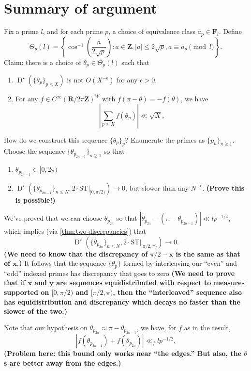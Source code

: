 \documentclass{article}
\DeclareMathOperator{\disc}{D}
\newcommand{\bF}{\mathbf{F}}
\newcommand{\bR}{\mathbf{R}}
\newcommand{\bx}{{\boldsymbol x}}
\newcommand{\by}{{\boldsymbol y}}
\newcommand{\bZ}{\mathbf{Z}}
\newcommand{\ST}{\mathrm{ST}}
\begin{document}
\section{Summary of argument}

Fix a prime $l$, and for each prime $p$, a choice of equivalence class 
$\bar a_p \in \bF_l$. Define 
\[
	\Theta_p(l) = \left\{ \cos^{-1}\left( \frac{a}{2\sqrt p}\right) : a\in \bZ, |a|\leqslant 2\sqrt p, a\equiv \bar a_p \pmod l\right\} .
\]
Claim: there is a choice of $\theta_p\in \Theta_p(l)$ such that 
\begin{enumerate}
\item
$\disc^\star(\{\theta_p\}_{p\leqslant X})$ is not $O(X^{-\epsilon})$ for any 
$\epsilon>0$. 

\item
For any $f\in C^\infty(\bR/2\pi \bZ)^W$ with $f(\pi-\theta) = -f(\theta)$, we 
have 
\[
	\left| \sum_{p\leqslant X} f(\theta_p)\right| \ll \sqrt X .
\]
\end{enumerate}

How do we construct this sequence $\{\theta_p\}_p$? Enumerate the primes as 
$\{p_n\}_{n\geqslant 1}$. Choose the sequence 
$\{\theta_{p_{2 n-1}}\}_{n\geqslant 1}$ so that 
\begin{enumerate}
\item
$\theta_{p_{2n-1}}\in [0,2\pi)$
\item
$\disc^\star\left(\{\theta_{p_{2n-1}}\}_{n\leqslant N}, 2\cdot \ST|_{[0,\pi/2)}\right) \to 0$, but slower 
than any $N^{-\epsilon}$. \textbf{(Prove this is possible!)} 
\end{enumerate}
We've proved that we can choose $\theta_{p_{2n}}$ so that 
$|\theta_{p_{2n}} - (\pi - \theta_{p_{2n-1}})| \ll l p^{-1/4}$, which 
implies (via \autoref{thm:two-discrepancies}) that 
\[
	\disc^\star\left(\{\theta_{p_{2n}}\}_{n\leqslant N}, 2\cdot \ST|_{[\pi/2,\pi)}\right) \to 0 .
\]
\textbf{(We need to know that the discrepancy of $\pi/2-\bx$ is the same as 
that of $\bx$.)} It follows that the sequence $\{\theta_p\}$ formed by 
interleaving our ``even'' and ``odd'' indexed primes has discrepancy that 
goes to zero \textbf{(We need to prove that if $\bx$ and $\by$ are sequences 
equidistributed with respect to measures supported on $[0,\pi/2)$ and 
$[\pi/2,\pi)$, then the ``interleaved'' sequence also has equidistribution 
and discrepancy which decays no faster than the slower of the two.)}

Note that our hypothesis on $\theta_{p_{2n}}\approx \pi - \theta_{p_{2n-1}}$, 
we have, for $f$ as in the result,  
\[
	|f(\theta_{p_{2n-1}}) + f(\theta_{p_{2n}})| \ll_f l p^{-1/2} .
\]
\textbf{(Problem here: this bound only works near ``the edges.'' But also, 
the $\theta$s are better away from the edges.)}
\end{document}
